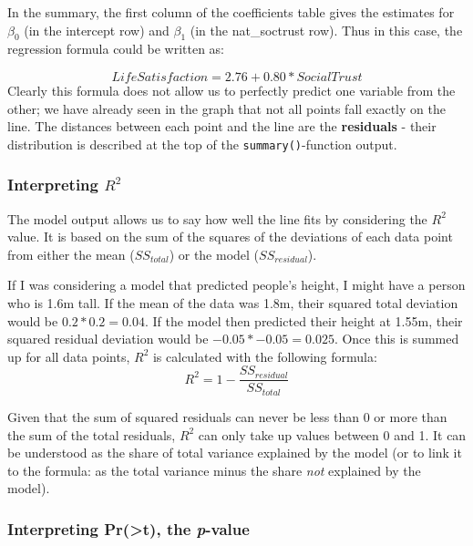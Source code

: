 \documentclass[
]{book}
\begin{document}
In the summary, the first column of the coefficients table gives the
estimates for \(\beta_{0}\) (in the intercept row) and \(\beta_{1}\) (in the
nat\_soctrust row). Thus in this case, the regression formula could be
written as:

\[LifeSatisfaction = 2.76 +  0.80 * SocialTrust\] Clearly this formula
does not allow us to perfectly predict one variable from the other; we
have already seen in the graph that not all points fall exactly on the
line. The distances between each point and the line are the
\textbf{residuals} - their distribution is described at the top of the
\texttt{summary()}-function output.

\hypertarget{interpreting-r2}{%
\subsubsection{\texorpdfstring{Interpreting \(R^2\)}{Interpreting R\^{}2}}\label{interpreting-r2}}

The model output allows us to say how well the line fits by considering
the \(R^2\) value. It is based on the sum of the squares of the deviations
of each data point from either the mean (\(SS_{total}\)) or the model
(\(SS_{residual}\)).

If I was considering a model that predicted people's height, I might
have a person who is 1.6m tall. If the mean of the data was 1.8m, their
squared total deviation would be \(0.2*0.2 = 0.04\). If the model then
predicted their height at 1.55m, their squared residual deviation would
be \(-0.05*-0.05 = 0.025\). Once this is summed up for all data points,
\(R^2\) is calculated with the following formula:
\[R^2 = 1 - \frac{SS_{residual}}{SS_{total}}\]

Given that the sum of squared residuals can never be less than 0 or more
than the sum of the total residuals, \(R^2\) can only take up values
between 0 and 1. It can be understood as the share of total variance
explained by the model (or to link it to the formula: as the total
variance minus the share \emph{not} explained by the model).

\hypertarget{interpreting-prt-the-p-value}{%
\subsubsection{\texorpdfstring{Interpreting Pr(\textgreater\textbar t\textbar), the \emph{p}-value}{Interpreting Pr(\textgreater\textbar t\textbar), the p-value}}\label{interpreting-prt-the-p-value}}
\end{document}

